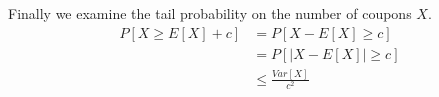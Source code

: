 \documentclass[10pt,a4paper]{article}
\begin{document}
Finally we examine the tail probability on the number of coupons $X$.
\begin{align*}
  P[X \ge E[X] + c] & = P[X - E[X] \ge c]\\
                    & = P[|X - E[X]| \ge c]\\
                    & \le \frac{Var[X]}{c^{2}}
\end{align*}
\end{document}
